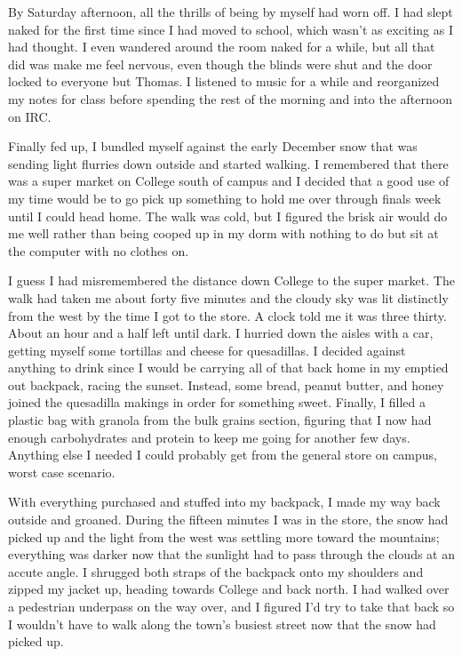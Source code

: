 By Saturday afternoon, all the thrills of being by myself had worn off.  I had slept naked for the first time since I had moved to school, which wasn't as exciting as I had thought.  I even wandered around the room naked for a while, but all that did was make me feel nervous, even though the blinds were shut and the door locked to everyone but Thomas.  I listened to music for a while and reorganized my notes for class before spending the rest of the morning and into the afternoon on IRC.

Finally fed up, I bundled myself against the early December snow that was sending light flurries down outside and started walking.  I remembered that there was a super market on College south of campus and I decided that a good use of my time would be to go pick up something to hold me over through finals week until I could head home.  The walk was cold, but I figured the brisk air would do me well rather than being cooped up in my dorm with nothing to do but sit at the computer with no clothes on.

I guess I had misremembered the distance down College to the super market.  The walk had taken me about forty five minutes and the cloudy sky was lit distinctly from the west by the time I got to the store.  A clock told me it was three thirty.  About an hour and a half left until dark.  I hurried down the aisles with a car, getting myself some tortillas and cheese for quesadillas.  I decided against anything to drink since I would be carrying all of that back home in my emptied out backpack, racing the sunset.  Instead, some bread, peanut butter, and honey joined the quesadilla makings in order for something sweet.  Finally, I filled a plastic bag with granola from the bulk grains section, figuring that I now had enough carbohydrates and protein to keep me going for another few days.  Anything else I needed I could probably get from the general store on campus, worst case scenario.

With everything purchased and stuffed into my backpack, I made my way back outside and groaned.  During the fifteen minutes I was in the store, the snow had picked up and the light from the west was settling more toward the mountains; everything was darker now that the sunlight had to pass through the clouds at an accute angle.  I shrugged both straps of the backpack onto my shoulders and zipped my jacket up, heading towards College and back north.  I had walked over a pedestrian underpass on the way over, and I figured I'd try to take that back so I wouldn't have to walk along the town's busiest street now that the snow had picked up.

